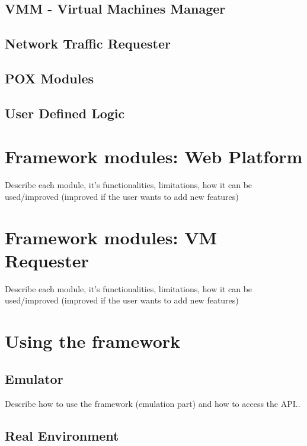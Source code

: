 \documentclass[12pt,english]{book}
\begin{document}
\subsection{VMM - Virtual Machines Manager}

\subsection{Network Traffic Requester}

\subsection{POX Modules}

\subsection{User Defined Logic}

\newpage


\section{Framework modules: Web Platform}

Describe each module, it's functionalities, limitations, how it can be used/improved (improved if the user wants to add new features)

\newpage


\section{Framework modules: VM Requester}

Describe each module, it's functionalities, limitations, how it can be used/improved (improved if the user wants to add new features)

\newpage


\section{Using the framework}

\subsection{Emulator}

Describe how to use the framework (emulation part) and how to access the API..

\subsection{Real Environment}
\end{document}
